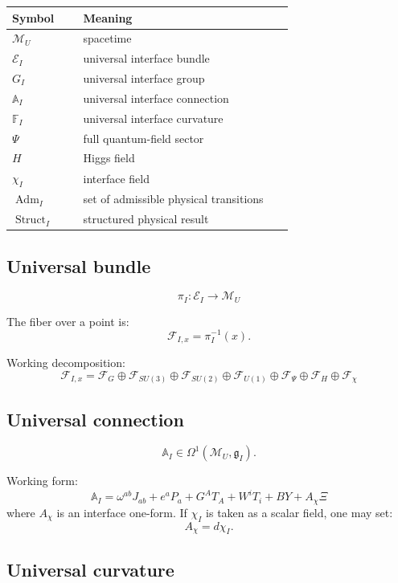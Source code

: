\documentclass[12pt,a4paper]{article}
\newcommand{\Adm}{\operatorname{Adm}}
\newcommand{\Struct}{\operatorname{Struct}}
\begin{document}
\begin{longtable}{>{\raggedright\arraybackslash}p{0.23\linewidth}>{\raggedright\arraybackslash}p{0.68\linewidth}}
\toprule
Symbol & Meaning \\
\midrule
$\mathcal M_U$ & spacetime \\
$\mathcal E_I$ & universal interface bundle \\
$G_I$ & universal interface group \\
$\mathbb A_I$ & universal interface connection \\
$\mathbb F_I$ & universal interface curvature \\
$\Psi$ & full quantum-field sector \\
$H$ & Higgs field \\
$\chi_I$ & interface field \\
$\Adm_I$ & set of admissible physical transitions \\
$\Struct_I$ & structured physical result \\
\bottomrule
\end{longtable}

\subsection{Universal bundle}

\[
\boxed{\pi_I:\mathcal E_I\to\mathcal M_U}
\]

The fiber over a point is:
\[
\boxed{\mathcal F_{I,x}=\pi_I^{-1}(x)}.
\]

Working decomposition:
\[
\boxed{
\mathcal F_{I,x}=\mathcal F_G\oplus\mathcal F_{SU(3)}\oplus\mathcal F_{SU(2)}\oplus\mathcal F_{U(1)}\oplus\mathcal F_\Psi\oplus\mathcal F_H\oplus\mathcal F_\chi
}
\]

\subsection{Universal connection}

\[
\boxed{\mathbb A_I\in\Omega^1(\mathcal M_U,\mathfrak g_I)}.
\]

Working form:
\[
\boxed{
\mathbb A_I=
\omega^{ab}J_{ab}+e^aP_a+G^AT_A+W^iT_i+BY+A_\chi\Xi
}
\]
where $A_\chi$ is an interface one-form. If $\chi_I$ is taken as a scalar field, one may set:
\[
\boxed{A_\chi=d\chi_I}.
\]

\subsection{Universal curvature}
\end{document}
